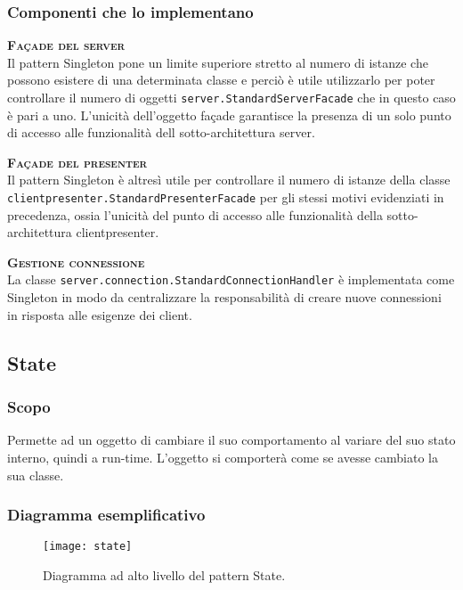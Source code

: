 \subsubsection{Componenti che lo implementano}
\begin{description}
  \item{\scshape\bfseries Façade del server}\\
Il pattern Singleton pone un limite superiore stretto al numero di istanze che possono esistere di una determinata classe e perciò è utile utilizzarlo per poter controllare il numero di oggetti \texttt{server.StandardServerFacade} che in questo caso è pari a uno. L'unicità dell'oggetto façade garantisce la presenza di un solo punto di accesso alle funzionalità dell sotto-architettura server.
  \item{\scshape\bfseries Façade del presenter}\\
Il pattern Singleton è altresì utile per controllare il numero di istanze della classe \texttt{clientpresenter.StandardPresenterFacade} per gli stessi motivi evidenziati in precedenza, ossia l'unicità del punto di accesso alle funzionalità della sotto-architettura clientpresenter.
  \item{\scshape\bfseries Gestione connessione}\\
La classe \texttt{server.connection.StandardConnectionHandler} è implementata come Singleton in modo da centralizzare la responsabilità di creare nuove connessioni in risposta alle esigenze dei client.
\end{description}

\subsection{State}

\subsubsection{Scopo}
Permette ad un oggetto di cambiare il suo comportamento al variare del suo stato interno, quindi a run-time. L'oggetto si comporterà come se avesse cambiato la sua classe.

\subsubsection{Diagramma esemplificativo}
\begin{figure}[H]
\centering
\texttt{[image: state]}
\caption{Diagramma ad alto livello del pattern State.}\label{fig:state}
\end{figure}

